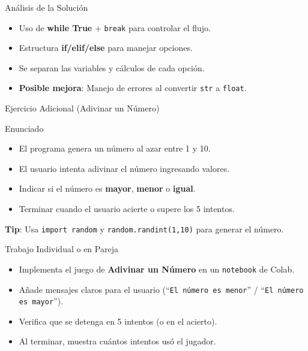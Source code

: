 \documentclass[10pt]{beamer}
\begin{document}
\begin{frame}{Análisis de la Solución}
  \begin{itemize}
    \item Uso de \textbf{while True} + \texttt{break} para controlar el flujo.
    \item Estructura \textbf{if/elif/else} para manejar opciones.
    \item Se separan las variables y cálculos de cada opción.
    \item \textbf{Posible mejora}: Manejo de errores al convertir \texttt{str} a \texttt{float}.
  \end{itemize}
\end{frame}

\begin{frame}{Ejercicio Adicional (Adivinar un Número)}
  \begin{block}{Enunciado}
    \begin{itemize}
      \item El programa genera un número al azar entre 1 y 10.
      \item El usuario intenta adivinar el número ingresando valores.
      \item Indicar si el número es \textbf{mayor}, \textbf{menor} o \textbf{igual}.
      \item Terminar cuando el usuario acierte o supere los 5 intentos.
    \end{itemize}
  \end{block}
  \textbf{Tip}: Usa \texttt{import random} y \texttt{random.randint(1,10)} para generar el número.
\end{frame}

\begin{frame}{Trabajo Individual o en Pareja}
  \begin{itemize}
    \item Implementa el juego de \textbf{Adivinar un Número} en un \texttt{notebook} de Colab.
    \item Añade mensajes claros para el usuario (“\texttt{El número es menor}” / “\texttt{El número es mayor}”).
    \item Verifica que se detenga en 5 intentos (o en el acierto).
    \item Al terminar, muestra cuántos intentos usó el jugador.
  \end{itemize}
\end{frame}
\end{document}
